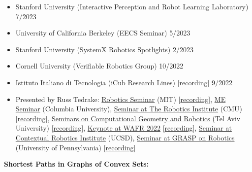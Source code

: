 \documentclass[11pt,a4paper,sans]{moderncv}
\begin{document}
\begin{itemize}

\item Stanford University (Interactive Perception and Robot Learning Laboratory) \hfill 7/2023
\item University of California Berkeley (EECS Seminar) \hfill 5/2023
\item Stanford University (SystemX Robotics Spotlights) \hfill 2/2023
\item Cornell University (Verifiable Robotics Group) \hfill 10/2022
\item  Istituto Italiano di Tecnologia (iCub Research Lines) [\href{https://www.youtube.com/watch?v=FoqAAgqgn-o}{\color{orange}recording}] \hfill 9/2022

\item
Presented by Russ Tedrake:
\href{https://robotics.mit.edu/robotics-seminar}{\color{cyan}Robotics Seminar} (MIT)
[\href{https://www.youtube.com/watch?v=JZokn4Pc-YY}{\color{orange}recording}],
\href{https://events.columbia.edu/cal/event/showEventMore.rdo}{\color{cyan}ME Seminar} (Columbia University),
\href{https://www.ri.cmu.edu/event/ri-seminar-russ-tedrake-mit-professor-2023-01-27/}{\color{cyan}Seminar at The Robotics Institute} (CMU)
[\href{https://www.youtube.com/watch?v=KSCC7mVJzaw}{\color{orange}recording}],
\href{http://acg.cs.tau.ac.il/cg-seminar/2023/Motion\%20Planning\%20Around\%20Obstacles\%20with\%20Convex\%20Optimization}{\color{cyan}Seminars on Computational Geometry and Robotics} (Tel Aviv University)
[\href{https://www.youtube.com/watch?v=5E2OaizkJEs}{\color{orange}recording}],
\href{https://wafr2022.github.io/index.html#keynotes}{\color{cyan}Keynote at WAFR 2022}
[\href{https://youtu.be/NBR2G4gD7XI?t=5911}{\color{orange}recording}],
\href{http://cri.ucsd.edu/seminars/motion-planning-around-obstacles-convex-optimization}{\color{cyan}Seminar at Contextual Robotics Institute} (UCSD),
\href{https://www.grasp.upenn.edu/events/grasp-on-robotics-russ-tedrake/}{\color{cyan}Seminar at GRASP on Robotics} (University of Pennsylvania) [\href{https://www.youtube.com/watch?v=wciDaoNSwwk}{\color{orange}recording}]



\end{itemize}

\vspace{5pt}

\textbf{Shortest Paths in Graphs of Convex Sets:}

\vspace{5pt}
\end{document}
